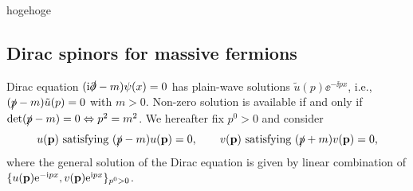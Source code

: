 \documentclass{CheatSheet}
\begin{document}
\summarystyle

hogehoge

\clearpage

\detailstyle

\subsection{Dirac spinors for massive fermions}
Dirac equation $({\mathrm{i}}\slashed{\partial}-m)\psi(x)=0$ has plain-wave solutions $\tilde u(p)\ee^{-\ii p x}$, i.e., $(\slashed{p}-m)\tilde u(p)=0$ with $m>0$.
Non-zero solution is available if and only if $\det(\slashed p-m)=0\Leftrightarrow p^2=m^2$.
We hereafter fix $p^0>0$ and consider
\begin{equation}
 u({\mathbf{p}})\text{~satisfying~}(\slashed p-m)u({\mathbf{p}})=0,
\qquad
 v({\mathbf{p}})\text{~satisfying~}(\slashed p+m)v({\mathbf{p}})=0,
\end{equation}
where the general solution of the Dirac equation is given by linear combination of $\{u({\mathbf{p}}){\mathrm{e}}^{-{\mathrm{i}} px}, v({\mathbf{p}}){\mathrm{e}}^{{\mathrm{i}} px}\}_{p^0>0}$.
\end{document}
